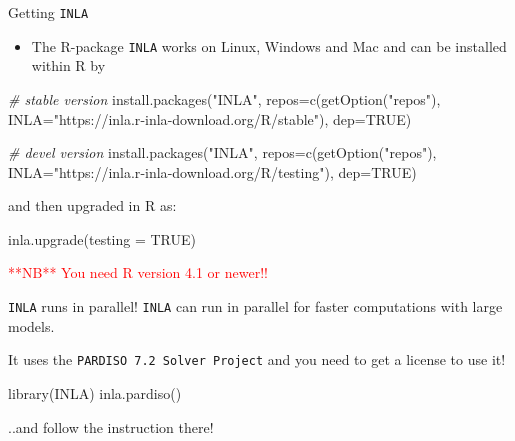 \documentclass[
  handout]{beamer}
\newenvironment{Shaded}{\begin{snugshade}}{\end{snugshade}}
\newcommand{\AttributeTok}[1]{\textcolor[rgb]{0.77,0.63,0.00}{#1}}
\newcommand{\CommentTok}[1]{\textcolor[rgb]{0.56,0.35,0.01}{\textit{#1}}}
\newcommand{\ConstantTok}[1]{\textcolor[rgb]{0.00,0.00,0.00}{#1}}
\newcommand{\FunctionTok}[1]{\textcolor[rgb]{0.00,0.00,0.00}{#1}}
\newcommand{\NormalTok}[1]{#1}
\newcommand{\StringTok}[1]{\textcolor[rgb]{0.31,0.60,0.02}{#1}}
\providecommand{\tightlist}{%
  \setlength{\itemsep}{0pt}\setlength{\parskip}{0pt}}
\begin{document}
\begin{frame}[fragile]{Getting \texttt{INLA}}
\protect\hypertarget{getting-inla-2}{}
\begin{itemize}
\tightlist
\item
  The R-package \texttt{INLA} works on Linux, Windows and Mac and can be
  installed within R by
\end{itemize}

\footnotesize

\begin{Shaded}
\begin{Highlighting}[]
\CommentTok{\# stable version}
\FunctionTok{install.packages}\NormalTok{(}\StringTok{"INLA"}\NormalTok{,}
          \AttributeTok{repos=}\FunctionTok{c}\NormalTok{(}\FunctionTok{getOption}\NormalTok{(}\StringTok{"repos"}\NormalTok{),}
          \AttributeTok{INLA=}\StringTok{"https://inla.r{-}inla{-}download.org/R/stable"}\NormalTok{),}
          \AttributeTok{dep=}\ConstantTok{TRUE}\NormalTok{)}

\CommentTok{\# devel version }
\FunctionTok{install.packages}\NormalTok{(}\StringTok{"INLA"}\NormalTok{,}
        \AttributeTok{repos=}\FunctionTok{c}\NormalTok{(}\FunctionTok{getOption}\NormalTok{(}\StringTok{"repos"}\NormalTok{),}
        \AttributeTok{INLA=}\StringTok{"https://inla.r{-}inla{-}download.org/R/testing"}\NormalTok{),}
        \AttributeTok{dep=}\ConstantTok{TRUE}\NormalTok{)}
\end{Highlighting}
\end{Shaded}

\normalsize

and then upgraded in R as:

\begin{Shaded}
\begin{Highlighting}[]
\FunctionTok{inla.upgrade}\NormalTok{(}\AttributeTok{testing =} \ConstantTok{TRUE}\NormalTok{)}
\end{Highlighting}
\end{Shaded}

\textcolor{red}{**NB** You need R version 4.1 or newer!!}
\end{frame}

\begin{frame}[fragile]{\texttt{INLA} runs in parallel!}
\protect\hypertarget{inla-runs-in-parallel}{}
\texttt{INLA} can run in parallel for faster computations with large
models.

It uses the \texttt{PARDISO\ 7.2\ Solver\ Project} and you need to get a
license to use it!

\begin{Shaded}
\begin{Highlighting}[]
\FunctionTok{library}\NormalTok{(INLA)}
\FunctionTok{inla.pardiso}\NormalTok{()}
\end{Highlighting}
\end{Shaded}

..and follow the instruction there!
\end{frame}
\end{document}
